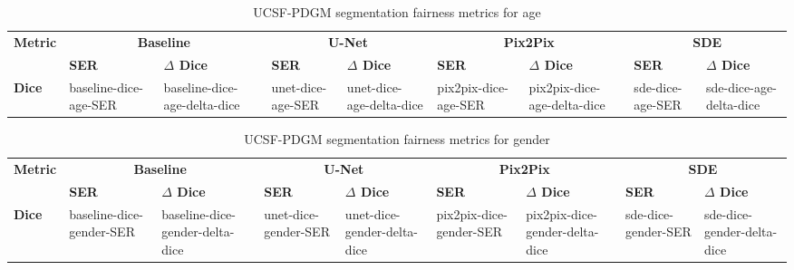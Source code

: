     \begin{table}[]
        \centering
        \caption{UCSF-PDGM segmentation fairness metrics for age}\label{tab:ucsf_age_seg}
        \begin{tabular}{l|llllllll}
        \hline
        \multirow{2}{*}{\textbf{Metric}} & \multicolumn{2}{c|}{\textbf{Baseline}}                   & \multicolumn{2}{c|}{\textbf{U-Net}}                              & \multicolumn{2}{c|}{\textbf{Pix2Pix}}                              & \multicolumn{2}{c}{\textbf{SDE}}    \\ \cline{2-9}
                                                                                            & \textbf{SER} & \textbf{$\Delta$ Dice}  & \textbf{SER} & \textbf{$\Delta$ Dice}  & \textbf{SER} & \textbf{$\Delta$ Dice} & \textbf{SER} & \textbf{$\Delta$ Dice} \\ \hline
                                                                    \textbf{Dice}  & baseline-dice-age-SER & baseline-dice-age-delta-dice & unet-dice-age-SER & unet-dice-age-delta-dice & pix2pix-dice-age-SER & pix2pix-dice-age-delta-dice & sde-dice-age-SER & sde-dice-age-delta-dice \\ \hline
        \end{tabular}
        \end{table}

    \begin{table}[]
        \centering
        \caption{UCSF-PDGM segmentation fairness metrics for gender}\label{tab:ucsf_gender_seg}
        \begin{tabular}{l|llllllll}
        \hline
        \multirow{2}{*}{\textbf{Metric}} & \multicolumn{2}{c|}{\textbf{Baseline}}                   & \multicolumn{2}{c|}{\textbf{U-Net}}                              & \multicolumn{2}{c|}{\textbf{Pix2Pix}}                              & \multicolumn{2}{c}{\textbf{SDE}}    \\ \cline{2-9}
                                                                                            & \textbf{SER} & \textbf{$\Delta$ Dice}  & \textbf{SER} & \textbf{$\Delta$ Dice}  & \textbf{SER} & \textbf{$\Delta$ Dice} & \textbf{SER} & \textbf{$\Delta$ Dice} \\ \hline
                                                                    \textbf{Dice}  & baseline-dice-gender-SER & baseline-dice-gender-delta-dice & unet-dice-gender-SER & unet-dice-gender-delta-dice & pix2pix-dice-gender-SER & pix2pix-dice-gender-delta-dice & sde-dice-gender-SER & sde-dice-gender-delta-dice \\ \hline
        \end{tabular}
        \end{table}